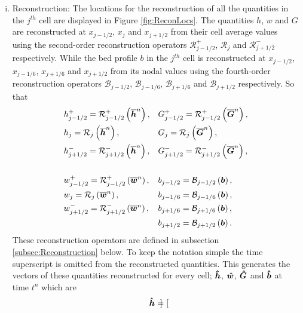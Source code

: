 \begin{enumerate}[(i)]
	\item Reconstruction: The locations for the reconstruction of all the quantities in the $j^{th}$ cell are displayed in Figure \ref{fig:ReconLocs}. The quantities $h$, $w$ and $G$ are reconstructed at $x_{j-1/2}$, $x_{j}$ and $x_{j+1/2}$ from their cell average values using the second-order reconstruction operators $\mathcal{R}^+_{j-1/2}$, $\mathcal{R}_{j}$ and $\mathcal{R}^-_{j+1/2}$ respectively. While the bed profile $b$ in the $j^{th}$ cell is reconstructed at $x_{j-1/2}$, $x_{j-1/6}$, $x_{j+1/6}$ and $x_{j+1/2}$ from its nodal values using the fourth-order reconstruction operators $\mathcal{B}_{j-1/2}$, $\mathcal{B}_{j-1/6}$, $\mathcal{B}_{j+1/6}$ and $\mathcal{B}_{j+1/2}$ respectively. So that
	\begin{align*}	&h^+_{j-1/2} = \mathcal{R}^+_{j-1/2} \left(\overline{\boldsymbol{h}}^n\right),&& G^+_{j-1/2} = \mathcal{R}^+_{j-1/2} \left(\overline{\boldsymbol{G}}^n\right),\\
	&h_j = \mathcal{R}_{j} \left(\overline{\boldsymbol{h}}^n\right),&& G_j = \mathcal{R}_{j} \left(\overline{\boldsymbol{G}}^n\right),\\
	&h^-_{j+1/2} = \mathcal{R}^-_{j+1/2}\left(\overline{\boldsymbol{h}}^n\right),&& G^-_{j+1/2} = \mathcal{R}^-_{j+1/2} \left(\overline{\boldsymbol{G}}^n\right),\\ \\
	&w^+_{j-1/2} = \mathcal{R}^+_{j-1/2} \left(\overline{\boldsymbol{w}}^n\right), &&b_{j-1/2} = \mathcal{B}_{j-1/2} \left(\boldsymbol{b}\right),  \\
	&w_{j} = \mathcal{R}_{j} \left(\overline{\boldsymbol{w}}^n\right), &&b_{j-1/6} = \mathcal{B}_{j-1/6}  \left(\boldsymbol{b}\right),\\
	&w^-_{j+1/2} = \mathcal{R}^-_{j+1/2} \left(\overline{\boldsymbol{w}}^n\right), &&b_{j+1/6} = \mathcal{B}_{j+1/6} \left(\boldsymbol{b}\right), \\
	& && b_{j+1/2} = \mathcal{B}_{j+1/2}  \left(\boldsymbol{b}\right).\\
	\end{align*}
	These reconstruction operators are defined in subsection \ref{subsec:Reconstruction} below. To keep the notation simple the time superscript is omitted from the reconstructed quantities.	This generates the vectors of these quantities reconstructed for every cell; $\boldsymbol{\hat{h}}$, $\boldsymbol{\hat{w}}$, $\boldsymbol{\hat{G}}$ and $\boldsymbol{\hat{b}}$ at time $t^n$ which are
	\begin{align*}\boldsymbol{\hat{h}} = \begin{bmatrix}

\end{bmatrix}
\end{align*}
\end{enumerate}
